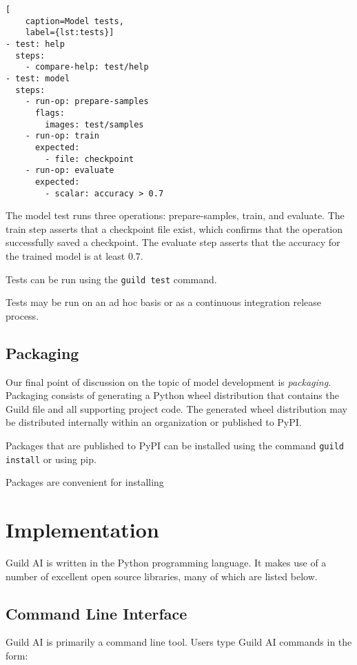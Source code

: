 \documentclass{article}
\begin{document}
\begin{lstlisting}[
    caption=Model tests,
    label={lst:tests}]
- test: help
  steps:
    - compare-help: test/help
- test: model
  steps:
    - run-op: prepare-samples
      flags:
        images: test/samples
    - run-op: train
      expected:
        - file: checkpoint
    - run-op: evaluate
      expected:
        - scalar: accuracy > 0.7
\end{lstlisting}

The model test runs three operations: prepare-samples, train, and
evaluate. The train step asserts that a checkpoint file exist, which
confirms that the operation successfully saved a checkpoint. The
evaluate step asserts that the accuracy for the trained model is at
least 0.7.

Tests can be run using the \verb|guild test| command.

Tests may be run on an ad hoc basis or as a continuous integration
release process.

\subsection{Packaging}

Our final point of discussion on the topic of model development is
\emph{packaging}. Packaging consists of generating a Python wheel
distribution that contains the Guild file and all supporting project
code. The generated wheel distribution may be distributed internally
within an organization or published to PyPI.

Packages that are published to PyPI can be installed using the command
\verb|guild install| or using pip.

Packages are convenient for installing

\section{Implementation}

Guild AI is written in the Python programming language. It makes use
of a number of excellent open source libraries, many of which are
listed below.

\subsection{Command Line Interface}

Guild AI is primarily a command line tool. Users type Guild AI
commands in the form:
\end{document}

